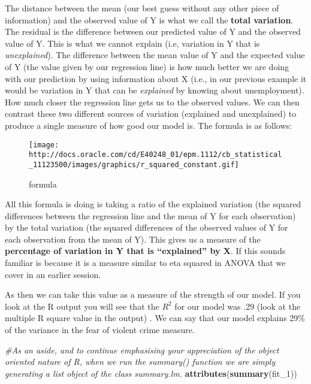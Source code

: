 \documentclass[
]{book}
\newenvironment{Shaded}{\begin{snugshade}}{\end{snugshade}}
\newcommand{\CommentTok}[1]{\textcolor[rgb]{0.56,0.35,0.01}{\textit{#1}}}
\newcommand{\FunctionTok}[1]{\textcolor[rgb]{0.13,0.29,0.53}{\textbf{#1}}}
\newcommand{\NormalTok}[1]{#1}
\begin{document}
The distance between the mean (our best guess without any other piece of information) and the observed value of Y is what we call the \textbf{total variation}. The residual is the difference between our predicted value of Y and the observed value of Y. This is what we cannot explain (i.e, variation in Y that is \emph{unexplained}). The difference between the mean value of Y and the expected value of Y (the value given by our regression line) is how much better we are doing with our prediction by using information about X (i.e., in our previous example it would be variation in Y that can be \emph{explained} by knowing about unemployment). How much closer the regression line gets us to the observed values. We can then contrast these two different sources of variation (explained and unexplained) to produce a single measure of how good our model is. The formula is as follows:

\begin{figure}
\centering
\texttt{[image: http://docs.oracle.com/cd/E40248\_01/epm.1112/cb\_statistical\_11123500/images/graphics/r\_squared\_constant.gif]}
\caption{formula}
\end{figure}

All this formula is doing is taking a ratio of the explained variation (the squared differences between the regression line and the mean of Y for each observation) by the total variation (the squared differences of the observed values of Y for each observation from the mean of Y). This gives us a measure of the \textbf{percentage of variation in Y that is ``explained'' by X}. If this sounds familiar is because it is a measure similar to eta squared in ANOVA that we cover in an earlier session.

As then we can take this value as a measure of the strength of our model. If you look at the R output you will see that the \(R^2\) for our model was .29 (look at the multiple R square value in the output) . We can say that our model explains 29\% of the variance in the fear of violent crime measure.

\begin{Shaded}
\begin{Highlighting}[]
\CommentTok{\#As an aside, and to continue emphasising your appreciation of the object oriented nature of R, when we run the summary() function we are simply generating a list object of the class summary.lm.}
\FunctionTok{attributes}\NormalTok{(}\FunctionTok{summary}\NormalTok{(fit\_1))}
\end{Highlighting}
\end{Shaded}
\end{document}

